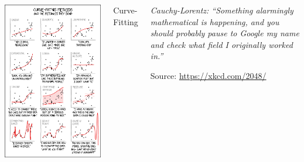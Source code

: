 
\begin{frame}%
%
\begin{columns}[T]
\begin{center}
	\includegraphics[width=.67\linewidth]{./gfx/xkcd-curveFitting}
\end{center}
%
\begin{Large}
	{Curve-Fitting}
\end{Large}
%
\begin{center}
	\vspace{60pt}
	\emph{Cauchy-Lorentz: \enquote{Something alarmingly mathematical is happening, and you should probably pause to Google my name and check what field I originally worked in.}}

	\vspace{6pt}
	Source: \url{https://xkcd.com/2048/}
\end{center}
\end{columns}

%
\end{frame}


